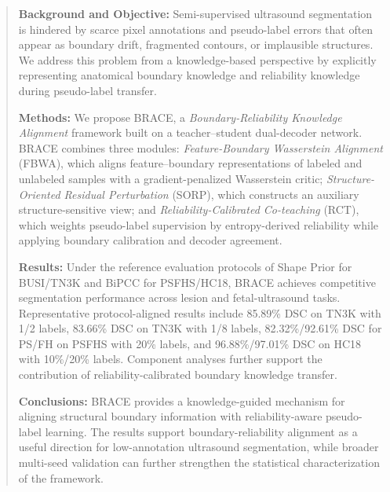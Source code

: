 \documentclass[a4paper,fleqn]{cas-dc}
\begin{document}



\begin{abstract}
\textbf{Background and Objective:} Semi-supervised ultrasound segmentation is hindered by scarce pixel annotations and pseudo-label errors that often appear as boundary drift, fragmented contours, or implausible structures. We address this problem from a knowledge-based perspective by explicitly representing anatomical boundary knowledge and reliability knowledge during pseudo-label transfer.

\textbf{Methods:} We propose BRACE, a \textit{Boundary-Reliability Knowledge Alignment} framework built on a teacher--student dual-decoder network. BRACE combines three modules: \textit{Feature-Boundary Wasserstein Alignment} (FBWA), which aligns feature--boundary representations of labeled and unlabeled samples with a gradient-penalized Wasserstein critic; \textit{Structure-Oriented Residual Perturbation} (SORP), which constructs an auxiliary structure-sensitive view; and \textit{Reliability-Calibrated Co-teaching} (RCT), which weights pseudo-label supervision by entropy-derived reliability while applying boundary calibration and decoder agreement.

\textbf{Results:} Under the reference evaluation protocols of Shape Prior for BUSI/TN3K and BiPCC for PSFHS/HC18, BRACE achieves competitive segmentation performance across lesion and fetal-ultrasound tasks. Representative protocol-aligned results include 85.89\% DSC on TN3K with 1/2 labels, 83.66\% DSC on TN3K with 1/8 labels, 82.32\%/92.61\% DSC for PS/FH on PSFHS with 20\% labels, and 96.88\%/97.01\% DSC on HC18 with 10\%/20\% labels. Component analyses further support the contribution of reliability-calibrated boundary knowledge transfer.

\textbf{Conclusions:} BRACE provides a knowledge-guided mechanism for aligning structural boundary information with reliability-aware pseudo-label learning. The results support boundary-reliability alignment as a useful direction for low-annotation ultrasound segmentation, while broader multi-seed validation can further strengthen the statistical characterization of the framework.

\end{abstract}
\end{document}
